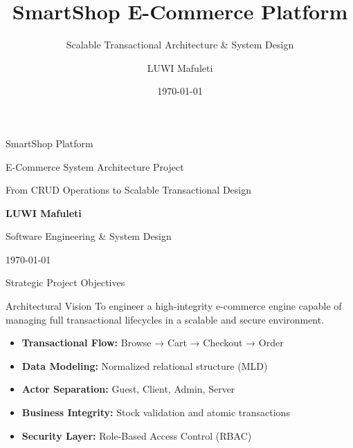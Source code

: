 \documentclass[10pt]{beamer}
\title{SmartShop E-Commerce Platform}
\subtitle{Scalable Transactional Architecture \& System Design}
\author{LUWI Mafuleti}
\institute{Software Engineering Division}
\date{\today}
\begin{document}
{
\begin{frame}
    \centering
    {\Huge \color{white} SmartShop Platform}

    \vspace{0.4cm}
    {\large \color{TechCyan} E-Commerce System Architecture Project}

    \vspace{0.8cm}
    {\small \color{white} From CRUD Operations to Scalable Transactional Design}

    \vspace{1.2cm}
    {\color{white}\textbf{LUWI Mafuleti}}

    \vspace{0.2cm}
    {\small \color{white} Software Engineering \& System Design}

    \vspace{0.2cm}
    {\small \color{white} \today}
\end{frame}
}

\begin{frame}{Strategic Project Objectives}

\begin{block}{Architectural Vision}
To engineer a high-integrity e-commerce engine capable of managing full transactional lifecycles in a scalable and secure environment.
\end{block}

\begin{itemize}
    \item \textbf{Transactional Flow:} Browse → Cart → Checkout → Order
    \item \textbf{Data Modeling:} Normalized relational structure (MLD)
    \item \textbf{Actor Separation:} Guest, Client, Admin, Server
    \item \textbf{Business Integrity:} Stock validation and atomic transactions
    \item \textbf{Security Layer:} Role-Based Access Control (RBAC)
\end{itemize}

\end{frame}
\end{document}
